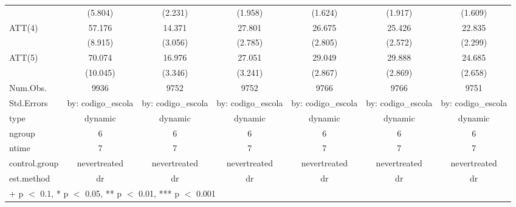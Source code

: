 \begin{table}
\begin{tabular}[t]{lcccccc}
 & (\num{5.804}) & (\num{2.231}) & (\num{1.958}) & (\num{1.624}) & (\num{1.917}) & (\num{1.609})\\
ATT(4) & \num{57.176} & \num{14.371} & \num{27.801} & \num{26.675} & \num{25.426} & \num{22.835}\\
 & (\num{8.915}) & (\num{3.056}) & (\num{2.785}) & (\num{2.805}) & (\num{2.572}) & (\num{2.299})\\
ATT(5) & \num{70.074} & \num{16.976} & \num{27.051} & \num{29.049} & \num{29.888} & \num{24.685}\\
 & (\num{10.045}) & (\num{3.346}) & (\num{3.241}) & (\num{2.867}) & (\num{2.869}) & (\num{2.658})\\
\midrule
Num.Obs. & \num{9936} & \num{9752} & \num{9752} & \num{9766} & \num{9766} & \num{9751}\\
Std.Errors & by: codigo\_escola & by: codigo\_escola & by: codigo\_escola & by: codigo\_escola & by: codigo\_escola & by: codigo\_escola\\
type & dynamic & dynamic & dynamic & dynamic & dynamic & dynamic\\
ngroup & 6 & 6 & 6 & 6 & 6 & 6\\
ntime & 7 & 7 & 7 & 7 & 7 & 7\\
control.group & nevertreated & nevertreated & nevertreated & nevertreated & nevertreated & nevertreated\\
est.method & dr & dr & dr & dr & dr & dr\\
\bottomrule
\multicolumn{7}{l}{\rule{0pt}{1em}+ p $<$ 0.1, * p $<$ 0.05, ** p $<$ 0.01, *** p $<$ 0.001}\\
\end{tabular}
\end{table}

